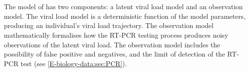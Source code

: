 \documentclass[thesis.tex]{subfiles}
\begin{document}

\section{\texorpdfstring{\textcite{hakkiOnset}}{Hakki \etal (2022)}} \label{ATACCC:sec:hakki}

The model of \textcite{hakkiOnset} has two components: a latent viral load model and an observation model.
The viral load model is a deterministic function of the model parameters, producing an individual's viral load trajectory.
The observation model mathematically formalises how the RT-PCR testing process produces noisy observations of the latent viral load.
The observation model includes the possibility of false positive and negatives, and the limit of detection of the RT-PCR test (see \cref{E-biology-data:sec:PCR}).
\end{document}
